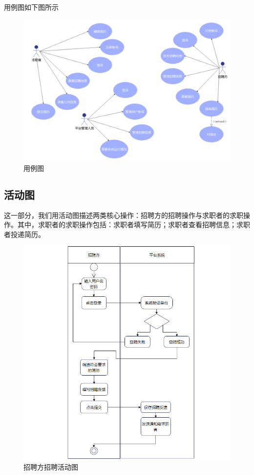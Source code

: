 \documentclass[UTF8,a4paper,10pt]{ctexart}
\begin{document}
用例图如下图所示
\begin{figure}[H]
    \centering
    \includegraphics[width=\textwidth]{img/用例图.png}
    \caption{用例图}
    \label{fig:用例图}
\end{figure}

\subsection{活动图}

这一部分，我们用活动图描述两类核心操作：招聘方的招聘操作与求职者的求职操作。其中，求职者的求职操作包括：求职者填写简历；求职者查看招聘信息；求职者投递简历。

\begin{figure}[H]
    \centering
    \includegraphics[width=\textwidth]{img/招聘方招聘活动图.png}
    \caption{招聘方招聘活动图}
    \label{fig:招聘方招聘活动图}
\end{figure}
\end{document}
